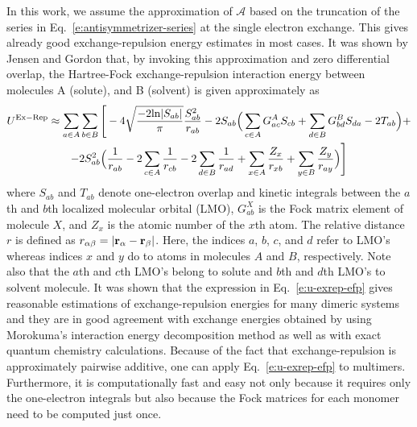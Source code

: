 \documentclass[a4paper,titlepage,twoside,fleqn,12pt]{book}
\begin{document}
\begin{refsection}
In this work, we assume the approximation of $\mathscr{A}$
based on the truncation of the series in Eq.~\eqref{e:antisymmetrizer-series}
at the single electron exchange. This gives already good exchange\hyp{}repulsion
energy estimates in most cases. It was shown by 
Jensen and Gordon\citep{Jensen.Gordon.JCP.1998,Jensen.Gordon.MolPhys.1996}
that, by invoking this
approximation and zero differential overlap, 
the Hartree\hyp{}Fock exchange\hyp{}repulsion interaction energy 
between molecules A (solute), and B (solvent) is given approximately as 
%
\begin{multline}\label{e:u-exrep-efp}
U^{\rm Ex-Rep} \approx \sum_{a \in A}\sum_{b \in B} \Bigg[
-4\sqrt{\frac{-2{\rm ln}|S_{ab}|}{\pi}} \frac{S_{ab}^2}{r_{ab}} 
-
2S_{ab} \Big( \sum_{c \in A} G^A_{ac} S_{cb} + 
\sum_{d \in B} G^B_{bd} S_{da} - 2 T_{ab} \Big) + \\
-2S^2_{ab} \Big( \frac{1}{r_{ab}} 
- 2\sum_{c \in A} \frac{1}{r_{cb}} 
- 2\sum_{d \in B} \frac{1}{r_{ad}}
+ \sum_{x \in A} \frac{Z_x}{r_{xb}} 
+ \sum_{y \in B} \frac{Z_y}{r_{ay}}  
\Big)
\Bigg]
\end{multline}
%
where $S_{ab}$ and $T_{ab}$ denote one\hyp{}electron overlap and kinetic integrals 
between the $a$th and $b$th localized molecular orbital (LMO), 
$G^X_{ab}$ is the Fock matrix element of molecule 
$X$, and $Z_x$ is the atomic number of the $x$th atom. 
The relative distance $r$ is defined as $r_{\alpha\beta} = \left|{\bf r}_\alpha - {\bf r}_\beta \right|$. 
Here, the indices $a$, $b$, $c$, and $d$ refer to LMO's whereas indices $x$ and $y$ 
do to atoms in molecules $A$ and $B$, respectively. Note also that the $a$th 
and $c$th LMO's belong to solute and $b$th and $d$th LMO's to solvent molecule. 
It was shown\citep{Jensen.Gordon.JCP.1998,Jensen.Gordon.MolPhys.1996,Kemp.Rintelman.Gordon.Jensen.TheoretChemAcc.2009} 
that the expression in Eq.~\eqref{e:u-exrep-efp} gives reasonable 
estimations of exchange\hyp{}repulsion energies for many dimeric systems 
and they are in good agreement with exchange energies obtained 
by using Morokuma's interaction energy decomposition 
method\citep{Kitaura.Morokuma.IJQC.1976} 
as well as 
with exact quantum chemistry calculations. Because of the fact that 
exchange\hyp{}repulsion is approximately pairwise 
additive,\citep{Chen.Li.JPCA.2010,Chen.Gordon.JCP.1996,Jens.Bruske.Grimme.PCCP.2009,
Gora.Sokalski.Leszczynski.Pett.JPCB.2005,Chaudret.Gresh.Parisel.Piquemel.JCC.2011} 
one can 
apply Eq.~\eqref{e:u-exrep-efp} to multimers. Furthermore, it is computationally fast 
and easy not only because it requires only the one\hyp{}electron integrals 
but also because the Fock matrices for each monomer need to be computed just once.


\end{refsection}
\end{document}
